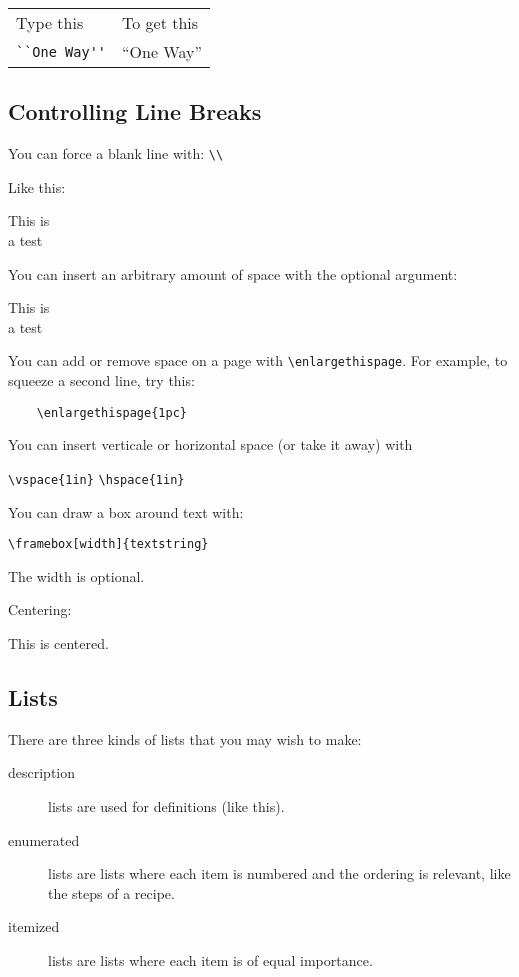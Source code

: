 \begin{enumerate}
\begin{tabular}{ll}
Type this & To get this \\
\verb+``One Way''+ & ``One Way'' \\
\end{tabular}

\subsection{Controlling Line Breaks}
You can force a blank line with: \verb+\\+

Like this:

This is\\
a test

You can insert an arbitrary amount of space with the optional
argument:

This is\\[3pt]
a test

You can add or remove space on a page with
\verb+\enlargethispage+. For example, to squeeze a second line, try
this:

\begin{verbatim}
    \enlargethispage{1pc}
\end{verbatim}

You can insert verticale or horizontal space (or take it away) with

\verb+\vspace{1in}+
\verb+\hspace{1in}+

You can draw a box around text with:

\verb+\framebox[width]{textstring}+

The width is optional.

Centering:

\begin{center}
This is centered.
\end{center}


\subsection{Lists}

There are three kinds of lists that you may wish to make:

\begin{description}
\item[description] lists are used for definitions (like this).
 \item[enumerated] lists are lists where each item is numbered and the
  ordering is relevant, like the steps of a recipe. 
\item[itemized] lists are lists where each item is of equal
  importance.
\end{description}


\end{enumerate}
